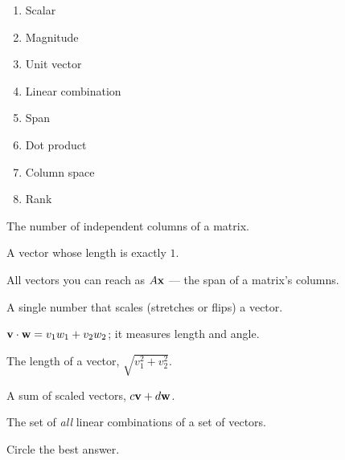 \vspace{4pt}
\noindent
\begin{minipage}[t]{0.44\textwidth}
\begin{enumerate}[leftmargin=2.2em, itemsep=7pt, label=\arabic*.]
  \item Scalar 
  \item Magnitude 
  \item Unit vector 
  \item Linear combination 
  \item Span 
  \item Dot product 
  \item Column space 
  \item Rank 
\end{enumerate}
\end{minipage}%
\hfill
\begin{minipage}[t]{0.53\textwidth}
\small
\begin{description}[leftmargin=1.4em, itemsep=3pt]
  \item[(A)] The number of independent columns of a matrix.
  \item[(B)] A vector whose length is exactly $1$.
  \item[(C)] All vectors you can reach as $A\mathbf{x}$ --- the span of a matrix's columns.
  \item[(D)] A single number that scales (stretches or flips) a vector.
  \item[(E)] $\mathbf{v}\cdot\mathbf{w}=v_1w_1+v_2w_2$; it measures length and angle.
  \item[(F)] The length of a vector, $\sqrt{v_1^2+v_2^2}$.
  \item[(G)] A sum of scaled vectors, $c\mathbf{v}+d\mathbf{w}$.
  \item[(H)] The set of \emph{all} linear combinations of a set of vectors.
\end{description}
\end{minipage}

Circle the best answer.

